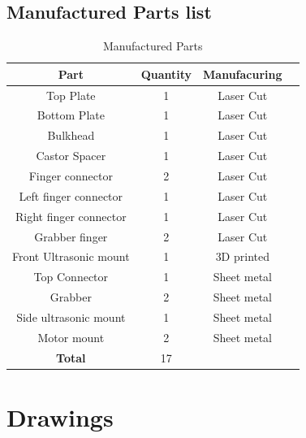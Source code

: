 \documentclass{article}
\begin{document}
\subsection{Manufactured Parts list}
\begin{table}[h]
    \centering
    \begin{tabular}{|c|c|c|c|}
        \hline
        \textbf{Part} & \textbf{Quantity} & \textbf{Manufacuring} \\ \hline
        \hline
        Top Plate & 1 & Laser Cut \\
        \hline
        Bottom Plate & 1 & Laser Cut \\
        \hline
        Bulkhead & 1 & Laser Cut \\
        \hline
        Castor Spacer & 1 & Laser Cut \\
        \hline
        Finger connector & 2 & Laser Cut \\
        \hline
        Left finger connector & 1 & Laser Cut \\
        \hline
        Right finger connector & 1 & Laser Cut \\
        \hline
        Grabber finger & 2 & Laser Cut \\
        \hline
        Front Ultrasonic mount & 1 & 3D printed \\
        \hline
        Top Connector & 1 & Sheet metal \\
        \hline
        Grabber & 2 & Sheet metal \\
        \hline
        Side ultrasonic mount & 1 & Sheet metal \\
        \hline
        Motor mount & 2 & Sheet metal \\
        \hline
        \textbf{Total} & 17 & \\ \hline
    \end{tabular}
    \caption{Manufactured Parts}
    \label{tab:manufactured_parts}
\end{table}

\section{Drawings}
\end{document}

